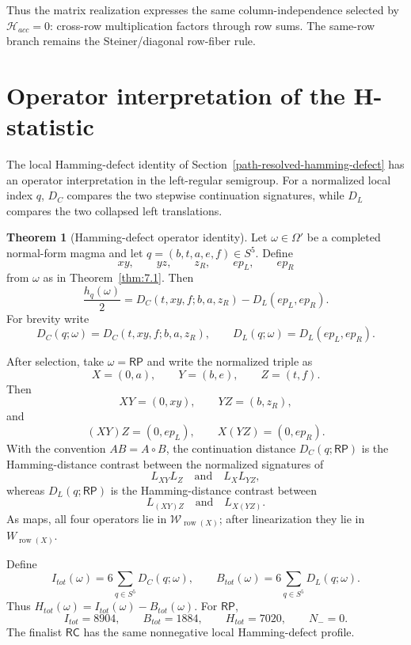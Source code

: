 \documentclass[11pt]{article}
\theoremstyle{definition}
\newtheorem{theorem}{Theorem}[section]
\newcommand{\RP}{\mathsf{RP}}
\newcommand{\RC}{\mathsf{RC}}
\begin{document}
Thus the matrix realization expresses the same column-independence selected by
\(\mathcal H_{acc}=0\): cross-row multiplication factors through row sums.
The same-row branch remains the Steiner/diagonal row-fiber rule.

\section{Operator interpretation of the H-statistic}\label{h-statistic-operator-interpretation}\label{h-statistic-operator-identity}

The local Hamming-defect identity of Section~\ref{path-resolved-hamming-defect}
has an operator interpretation in the left-regular semigroup.  For a normalized
local index \(q\), \(D_C\) compares the two stepwise continuation signatures,
while \(D_L\) compares the two collapsed left translations.

\begin{theorem}[Hamming-defect operator identity]
\label{thm:17.1}
Let \(\omega\in\Omega'\) be a completed normal-form magma and let
\(q=(b,t,a,e,f)\in S^5\).  Define
\[
xy,
\qquad
 yz,
\qquad
 z_R,
\qquad
 ep_L,
\qquad
 ep_R
\]
from \(\omega\) as in Theorem~\ref{thm:7.1}.  Then
\[
\frac{h_q(\omega)}2
=
D_C(t,xy,f;b,a,z_R)-D_L(ep_L,ep_R).
\]
For brevity write
\[
D_C(q;\omega)=D_C(t,xy,f;b,a,z_R),
\qquad
D_L(q;\omega)=D_L(ep_L,ep_R).
\]

After selection, take \(\omega=\RP\) and write the normalized triple as
\[
X=(0,a),\qquad Y=(b,e),\qquad Z=(t,f).
\]
Then
\[
XY=(0,xy),\qquad YZ=(b,z_R),
\]
and
\[
(XY)Z=(0,ep_L),\qquad X(YZ)=(0,ep_R).
\]
With the convention \(AB=A\circ B\), the continuation distance
\(D_C(q;\RP)\) is the Hamming-distance contrast between the normalized
signatures of
\[
L_{XY}L_Z
\quad\text{and}\quad
L_XL_{YZ},
\]
whereas \(D_L(q;\RP)\) is the Hamming-distance contrast between
\[
L_{(XY)Z}
\quad\text{and}\quad
L_{X(YZ)}.
\]
As maps, all four operators lie in \(\mathcal W_{\operatorname{row}(X)}\);
after linearization they lie in \(W_{\operatorname{row}(X)}\).

Define
\[
I_{tot}(\omega)=6\sum_{q\in S^5}D_C(q;\omega),
\qquad
B_{tot}(\omega)=6\sum_{q\in S^5}D_L(q;\omega).
\]
Thus \(H_{tot}(\omega)=I_{tot}(\omega)-B_{tot}(\omega)\).  For \(\RP\),
\[
I_{tot}=8904,
\qquad
B_{tot}=1884,
\qquad
H_{tot}=7020,
\qquad
N_-=0.
\]
The finalist \(\RC\) has the same nonnegative local Hamming-defect profile.
\end{theorem}
\end{document}
